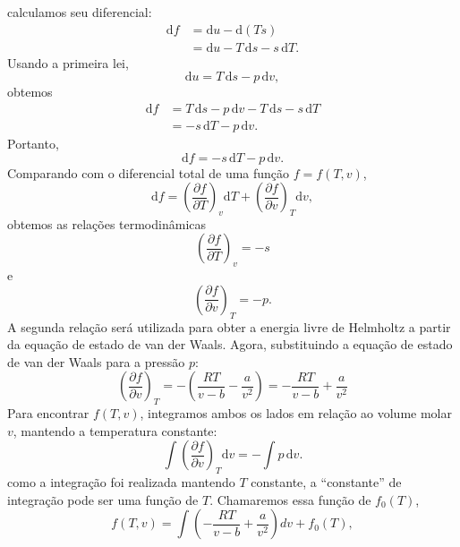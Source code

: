 \documentclass[11pt,a4paper]{article}
\renewcommand{\dd}{\mathrm{d}}
\begin{document}
%
calculamos seu diferencial:
\begin{align}
    \dd f
    &=
    \dd u-\dd(Ts)\\
    &=
    \dd u-T\,\dd s-s\,\dd T.
\end{align}
%
Usando a primeira lei,
%
\begin{equation}
    \dd u=T\,\dd s-p\,\dd v,
\end{equation}
%
obtemos
%
\begin{align}
    \dd f
    &=
    T\,\dd s-p\,\dd v
    -T\,\dd s
    -s\,\dd T\\
    &=
    -s\,\dd T-p\,\dd v.
\end{align}
%
Portanto,
%
\begin{equation}
    \dd f=-s\,\dd T-p\,\dd v.
    \label{eq:df}
\end{equation}
%
Comparando com o diferencial total de uma função
$f=f(T,v)$,
%
\begin{equation}
    \dd f
    =
    \left(\frac{\partial f}{\partial T}\right)_v
    \dd T
    +
    \left(\frac{\partial f}{\partial v}\right)_T
    \dd v,
\end{equation}
%
obtemos as relações termodinâmicas
%
\begin{equation}
    \left(\frac{\partial f}{\partial T}\right)_v=-s
    \label{eq:s}
\end{equation}
%
e
%
\begin{equation}
    \left(\frac{\partial f}{\partial v}\right)_T=-p.
    \label{eq:pressure_free_energy}
\end{equation}
%
A segunda relação será utilizada para obter a energia livre de
Helmholtz a partir da equação de estado de van der Waals. Agora, substituindo a equação de estado de van der Waals para a pressão $p$:
%
\begin{equation}
    \left(\frac{\partial f}{\partial v}\right)_T = -\left( \frac{RT}{v-b} - \frac{a}{v^2} \right) = -\frac{RT}{v-b} + \frac{a}{v^2}
\end{equation}
%
Para encontrar $f(T,v)$, integramos ambos os lados  em relação ao volume molar $v$, mantendo a temperatura constante:
%
\begin{equation}
    \int
    \left(\frac{\partial f}{\partial v}\right)_T
    \dd v
    =
    -\int p\,\dd v.
\end{equation}
%
como a integração foi realizada mantendo $T$ constante, a ``constante'' de integração pode ser uma função de $T$. Chamaremos essa função de $f_0(T)$,
%
\begin{equation}
    f(T,v) = \int \left( -\frac{RT}{v-b} + \frac{a}{v^2} \right) dv +
    f_0(T),
\end{equation}
\end{document}
